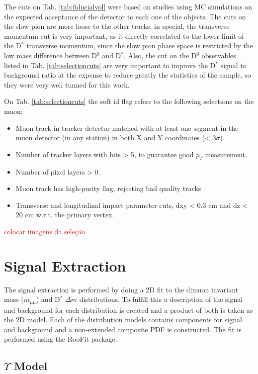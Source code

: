 The cuts on Tab. \ref{tab:fiducialvol} were based on studies using MC simulations on the expected acceptance of the detector to each one of the objects. The cuts on the slow pion are more loose to the other tracks, in special, the transverse momentum cut is very important, as it directly correlated to the lower limit of the D$^*$ transverse momentum, since the slow pion phase space is restricted by the low mass difference between D$^0$ and D$^*$. Also, the cut on the D$^0$ observables listed in Tab. \ref{tab:selectioncuts} are very important to improve the D$^*$ signal to background ratio at the expense to reduce greatly the statistics of the sample, so they were very well tunned for this work.

On Tab. \ref{tab:selectioncuts} the soft id flag refers to the following selections on the muon:
\begin{itemize}
  \item Muon track in tracker detector matched with at least one segment in the muon detector (in any station) in both X and Y coordinates (< 3$\sigma$).
  \item Number of tracker layers with hits > 5, to guarantee good $p_T$ measurement.
  \item Number of pixel layers > 0.
  \item Muon track has high-purity flag, rejecting bad quality tracks
  \item Transverse and longitudinal impact parameter cuts, dxy < 0.3 cm and dz < 20 cm w.r.t. the primary vertex.
\end{itemize}

\textcolor{red}{colocar imagens da seleção}

\section{Signal Extraction}\label{sec:sig_extraction}

The signal extraction is performed by doing a 2D fit to the dimuon invariant mass ($m_{\mu\mu}$) and D$^*$ $\Delta m$ distributions. To fulfill this a description of the signal and background for each distribution is created and a product of both is taken as the 2D model. Each of the distribution models contains components for signal and background and a non-extended composite PDF is constructed. The fit is performed using the RooFit package.

\subsection{\texorpdfstring{$\Upsilon$}{Y} Model}

